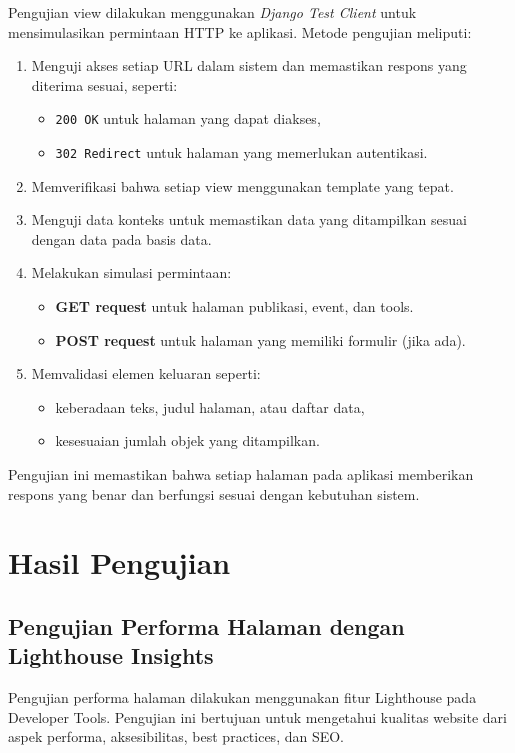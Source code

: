 Pengujian view dilakukan menggunakan \textit{Django Test Client} untuk mensimulasikan permintaan HTTP ke aplikasi. Metode pengujian meliputi:

\begin{enumerate}
    \item Menguji akses setiap URL dalam sistem dan memastikan respons yang diterima sesuai, seperti:
    \begin{itemize}
        \item \texttt{200 OK} untuk halaman yang dapat diakses,
        \item \texttt{302 Redirect} untuk halaman yang memerlukan autentikasi.
    \end{itemize}
    \item Memverifikasi bahwa setiap view menggunakan template yang tepat.
    \item Menguji data konteks untuk memastikan data yang ditampilkan sesuai dengan data pada basis data.
    \item Melakukan simulasi permintaan:
    \begin{itemize}
        \item \textbf{GET request} untuk halaman publikasi, event, dan tools.
        \item \textbf{POST request} untuk halaman yang memiliki formulir (jika ada).
    \end{itemize}
    \item Memvalidasi elemen keluaran seperti:
    \begin{itemize}
        \item keberadaan teks, judul halaman, atau daftar data,
        \item kesesuaian jumlah objek yang ditampilkan.
    \end{itemize}
\end{enumerate}

Pengujian ini memastikan bahwa setiap halaman pada aplikasi memberikan respons yang benar dan berfungsi sesuai dengan kebutuhan sistem.

\section{Hasil Pengujian}
\subsection{Pengujian Performa Halaman dengan Lighthouse Insights}

Pengujian performa halaman dilakukan menggunakan fitur Lighthouse pada Developer Tools. Pengujian ini bertujuan untuk mengetahui kualitas website dari aspek performa, aksesibilitas, best practices, dan SEO.

